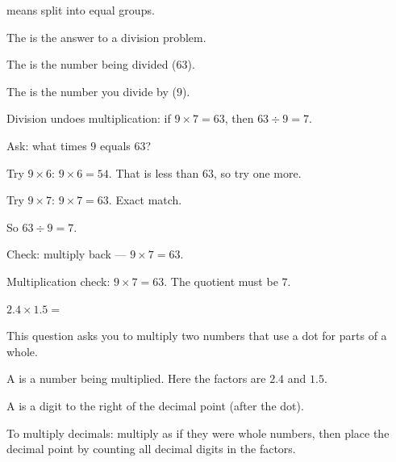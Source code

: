 \begin{words}
  \item {}means split into equal groups.
  \item The is the answer to a division problem.
  \item The is the number being divided ($63$).
  \item The is the number you divide by ($9$).
  \item Division undoes multiplication: if $9 \times 7 = 63$, then $63 \div 9 = 7$.
\end{words}

\begin{steps}
  \item Ask: what times $9$ equals $63$?
  \item Try $9 \times 6$: $9 \times 6 = 54$. That is less than $63$, so try one more.
  \item Try $9 \times 7$: $9 \times 7 = 63$. Exact match.
  \item So $63 \div 9 = 7$.
  \item Check: multiply back --- $9 \times 7 = 63$.
\end{steps}


\noindent Multiplication check: $9 \times 7 = 63$. The quotient must be $7$.


\noindent $2.4 \times 1.5 = $\ansblank{}


\noindent This question asks you to multiply two numbers that use a dot for
parts of a whole.

\begin{words}
  \item A is a number being multiplied. Here the factors are $2.4$ and $1.5$.
  \item A is a digit to the right of the decimal point (after the dot).
  \item To multiply decimals: multiply as if they were whole numbers, then place the
        decimal point by counting all decimal digits in the factors.
\end{words}

